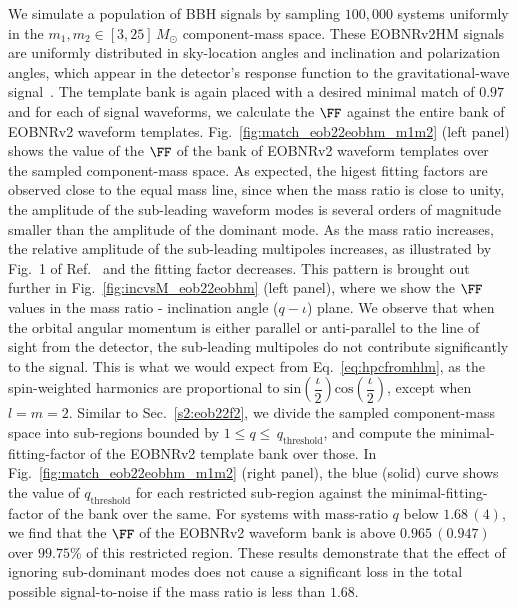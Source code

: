 We simulate a population of BBH signals by sampling $100,000$ systems
uniformly in the $m_1,m_2 \in [3,25] \, M_\odot$ component-mass space. These
EOBNRv2HM signals are uniformly distributed in sky-location angles and
inclination and polarization angles, which appear in the detector's response
function to the gravitational-wave signal~\citep{Sathyaprakash:2009xs}. The 
template bank
is again placed with a desired minimal match of $0.97$ and for each of signal
waveforms, we calculate the $\FF$ against the entire bank of EOBNRv2 waveform
templates.  Fig.~\ref{fig:match_eob22eobhm_m1m2} (left panel) shows the value 
of the $\FF$
of the bank of EOBNRv2 waveform templates over the sampled component-mass 
space. As expected, the higest fitting factors are observed close to the equal mass
line, since when the mass ratio is close to unity, the amplitude of the
sub-leading waveform modes is several orders of magnitude smaller than the
amplitude of the dominant mode. As the mass ratio increases, the relative
amplitude of the sub-leading multipoles increases, as illustrated by Fig.~1 of
Ref.~\citep{BuonannoEOBv2Main} and the fitting factor decreases. This pattern
is brought out further in Fig.~\ref{fig:incvsM_eob22eobhm} (left panel),
where we show the $\FF$ values in the mass ratio - inclination angle 
($q-\iota$) plane. We
observe that when the orbital angular momentum is either parallel or anti-parallel
to the line of sight from the detector, the sub-leading multipoles do not 
contribute significantly to the signal. This is what we would expect from
Eq.~\ref{eq:hpcfromhlm}, as the spin-weighted harmonics are proportional to
$\mathrm{sin}(\dfrac{\iota}{2})\mathrm{cos}(\dfrac{\iota}{2})$, except when
$l=m=2$. Similar to Sec.~\ref{s2:eob22f2}, we divide the sampled component-mass
space into sub-regions bounded by $1\leq q \leq\,q_{\mathrm{threshold}}$, and compute
the minimal-fitting-factor of the EOBNRv2 template bank over those. In
Fig.~\ref{fig:match_eob22eobhm_m1m2} (right panel), the blue (solid) curve shows the 
value of $q_{\mathrm{threshold}}$ for each restricted sub-region against the 
minimal-fitting-factor of the bank over the same. For systems
with mass-ratio $q$ below $1.68\, (4)$, we find that the $\FF$ of the
EOBNRv2 waveform bank is above $0.965\, (0.947)$ over $99.75\%$ of this
restricted region.  These results demonstrate that
the effect of ignoring sub-dominant modes does not cause a significant loss in
the total possible signal-to-noise if the mass ratio is less than $1.68$. 
